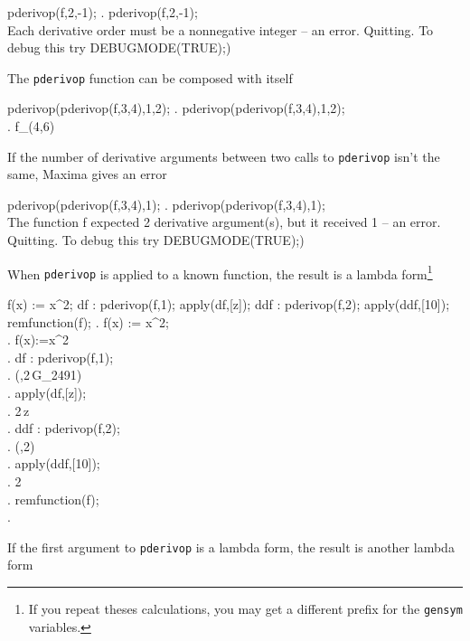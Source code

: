{{\beginmaximasession
pderivop(f,2,-1);
\maximatexsession
{}.  pderivop(f,2,-1); \\
\p
Each derivative order must be a nonnegative integer
 -- an error.  Quitting.  To debug this try DEBUGMODE(TRUE);) \\
\endmaximasession

\noindent The {\tt pderivop} function can be composed with itself

\beginmaximasession
pderivop(pderivop(f,3,4),1,2);
\maximatexsession
{}.  pderivop(pderivop(f,3,4),1,2); \\
.  f_{\left(4,6\right)} \\
\endmaximasession

\noindent If the number of derivative arguments between two calls 
to {\tt pderivop} isn't the same, Maxima gives an error

\beginmaximasession
pderivop(pderivop(f,3,4),1);
\maximatexsession
{}.  pderivop(pderivop(f,3,4),1); \\
\p
The function f expected 2 derivative argument(s), but it received 1
 -- an error.  Quitting.  To debug this try DEBUGMODE(TRUE);) \\
\endmaximasession

When {\tt pderivop} is applied to a known function, the result is
a lambda form\footnote{If you repeat theses calculations, you 
may get a different prefix for the {\tt gensym} variables.}

\beginmaximasession
f(x) := x^2;
df : pderivop(f,1);
apply(df,[z]);
ddf : pderivop(f,2);
apply(ddf,[10]);
remfunction(f);
\maximatexsession
{}.  f(x) := x^2; \\
.  f\left(x\right):=x^2 \\
.  df : pderivop(f,1); \\
.  \lambda\left(\left[ G_{2491} \right] ,2\,G_{2491}\right) \\
.  apply(df,[z]); \\
.  2\,z \\
.  ddf : pderivop(f,2); \\
.  \lambda\left(\left[ G_{2492} \right] ,2\right) \\
.  apply(ddf,[10]); \\
.  2 \\
.  remfunction(f); \\
.  \left[ f \right] \\
\endmaximasession

If the first argument to {\tt pderivop} is a lambda form, the
result is another lambda form

}}

